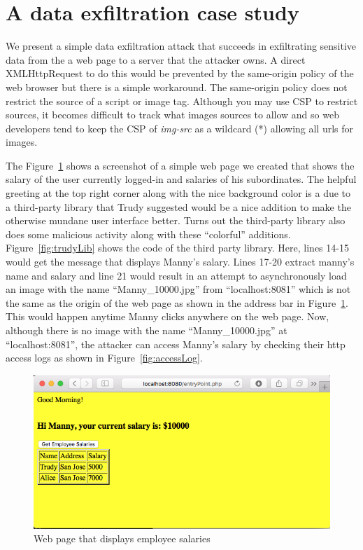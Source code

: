 \section{A data exfiltration case study \label{sec:exfil}}
We present a simple data exfiltration attack that succeeds in exfiltrating sensitive
data from the a web page to a server that the attacker owns. A direct XMLHttpRequest
to do this would be prevented by the same-origin policy of the web browser but there
is a simple workaround. The same-origin policy does not restrict the source of a
script or image tag. Although you may use CSP to restrict sources, it becomes difficult
to track what images sources to allow and so web developers tend to keep the CSP
of \textit{img-src} as a wildcard (*) allowing all urls for images.

The Figure~\ref{fig:salaryMgr} shows a screenshot of a simple web page we created
that shows the salary of the user currently logged-in and salaries of his subordinates.
The helpful greeting at the top right corner along with the nice background color
is a due to a third-party library that Trudy suggested would be a nice addition
to make the otherwise mundane user interface better. Turns out the third-party
library also does some malicious activity along with these ``colorful'' additions.
Figure~\ref{fig:trudyLib} shows the code of the third party library. Here, lines
14-15 would get the message that displays Manny's salary. Lines 17-20 extract manny's
name and salary and line 21 would result in an attempt to asynchronously load an
image with the name ``Manny\_10000.jpg'' from ``localhost:8081'' which is not the
same as the origin of the web page as shown in the address bar in Figure~\ref{fig:salaryMgr}.
This would happen anytime Manny clicks anywhere on the web page. Now, although there
is no image with the name ``Manny\_10000.jpg'' at ``localhost:8081'', the attacker
can access Manny's salary by checking their http access logs as shown in
Figure~\ref{fig:accessLog}.

\begin{figure}
  \centering
  \includegraphics[scale=0.5, frame]{images/scrShot1}
  \caption{Web page that displays employee salaries}
  \label{fig:salaryMgr}
\end{figure}

